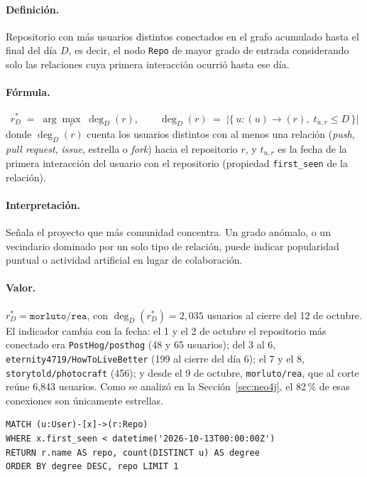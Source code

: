 \paragraph{Definición.} Repositorio con más usuarios distintos conectados en el grafo acumulado hasta el final del día $D$, es decir, el nodo \texttt{Repo} de mayor grado de entrada considerando solo las relaciones cuya primera interacción ocurrió hasta ese día.

\paragraph{Fórmula.}
\[
r^{*}_D \;=\; \arg\max_{r} \; \deg_D(r),
\qquad
\deg_D(r) \;=\; \bigl|\{\, u : (u) \rightarrow (r),\; t_{u,r} \le D \,\}\bigr|
\]
donde $\deg_D(r)$ cuenta los usuarios distintos con al menos una relación (\textit{push}, \textit{pull request}, \textit{issue}, estrella o \textit{fork}) hacia el repositorio $r$, y $t_{u,r}$ es la fecha de la primera interacción del usuario con el repositorio (propiedad \texttt{first\_seen} de la relación).

\paragraph{Interpretación.} Señala el proyecto que más comunidad concentra. Un grado anómalo, o un vecindario dominado por un solo tipo de relación, puede indicar popularidad puntual o actividad artificial en lugar de colaboración.

\paragraph{Valor.} $r^{*}_D = \texttt{morluto/rea}$, con $\deg_D(r^{*}_D) = 2{,}035$ usuarios al cierre del 12 de octubre. El indicador cambia con la fecha: el 1 y el 2 de octubre el repositorio más conectado era \texttt{PostHog/posthog} (48 y 65 usuarios); del 3 al 6, \texttt{eternity4719/HowToLiveBetter} (199 al cierre del día 6); el 7 y el 8, \texttt{storytold/photocraft} (456); y desde el 9 de octubre, \texttt{morluto/rea}, que al corte reúne 6,843 usuarios. Como se analizó en la Sección~\ref{sec:neo4j}, el 82\,\% de esas conexiones son únicamente estrellas.

\begin{lstlisting}[style=plano]
MATCH (u:User)-[x]->(r:Repo)
WHERE x.first_seen < datetime('2026-10-13T00:00:00Z')
RETURN r.name AS repo, count(DISTINCT u) AS degree
ORDER BY degree DESC, repo LIMIT 1
\end{lstlisting}

